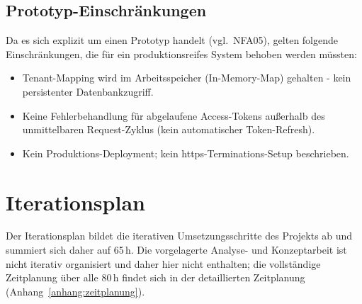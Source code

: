 \documentclass[11pt, a4paper, oneside]{report}
\begin{document}
\subsection*{Prototyp-Einschränkungen}

Da es sich explizit um einen Prototyp handelt (vgl.\ NFA05), gelten folgende
Einschränkungen, die für ein produktionsreifes System behoben werden müssten:

\begin{itemize}[leftmargin=1.5em]
  \item Tenant-Mapping wird im Arbeitsspeicher (In-Memory-Map) gehalten - kein
        persistenter Datenbankzugriff.
  \item Keine Fehlerbehandlung für abgelaufene Access-Tokens außerhalb des
        unmittelbaren Request-Zyklus (kein automatischer Token-Refresh).
  \item Kein Produktions-Deployment; kein \gls{https}-Terminations-Setup beschrieben.
\end{itemize}

\section{Iterationsplan}
\label{anhang:iterationsplan}

Der Iterationsplan bildet die iterativen Umsetzungsschritte des Projekts ab und
summiert sich daher auf 65\,h. Die vorgelagerte Analyse- und Konzeptarbeit ist
nicht iterativ organisiert und daher hier nicht enthalten; die vollständige
Zeitplanung über alle 80\,h findet sich in der detaillierten Zeitplanung
(Anhang~\ref{anhang:zeitplanung}).
\end{document}
